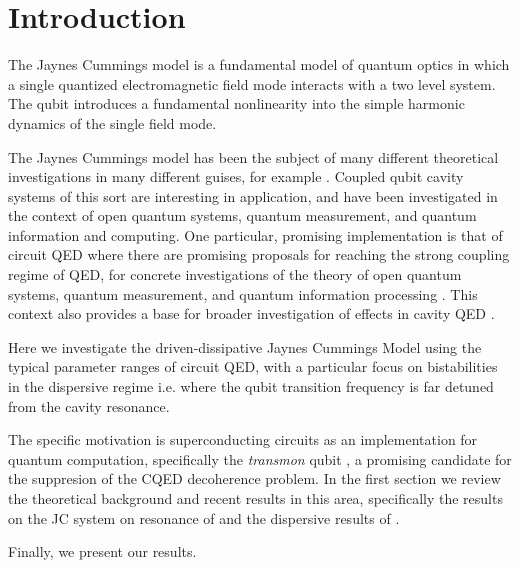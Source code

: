 \section{Introduction}
The Jaynes Cummings model is a fundamental model of quantum optics in which a single quantized electromagnetic field mode interacts with a two level system. 
The qubit introduces a fundamental nonlinearity into the simple harmonic dynamics of the single field mode. 

The Jaynes Cummings model has been the subject of many different theoretical investigations in many different guises, for example
\cite{Abdalla2011}
\cite{Benivegna1994}.
Coupled qubit cavity systems of this sort are interesting in application, and have been investigated in the context of open quantum systems, quantum measurement, and quantum information and computing.
One particular, promising implementation is that of circuit QED 
\cite{Blais2004a} 
\cite{Makhlin2000} 
\cite{Koch2007} 
where there are promising proposals for reaching the strong coupling regime of QED, for concrete investigations of the theory of open quantum systems, quantum measurement, and quantum information processing
\cite{You2003} 
\cite{Hood2000} 
\cite{Irish2003} .
This context also provides a base for broader investigation of effects in cavity QED 
\cite{Al-Saidi2002} 
\cite{Plastina2003} 
\cite{Marquardt2001} .

Here we investigate the driven-dissipative Jaynes Cummings Model using the typical parameter ranges of circuit QED, with a particular focus on bistabilities in the dispersive regime i.e. where the qubit transition frequency is far detuned from the cavity resonance.

The specific motivation is superconducting circuits as an implementation for quantum computation, specifically the \emph{transmon} qubit \cite{Koch2007}, a promising candidate for the suppresion of the CQED decoherence problem.
In the first section we review the theoretical background and recent results in this area, specifically the results on the JC system on resonance of \cite{Carmichael2015} and the dispersive results of \cite{Bishop2010}.

Finally, we present our results.
